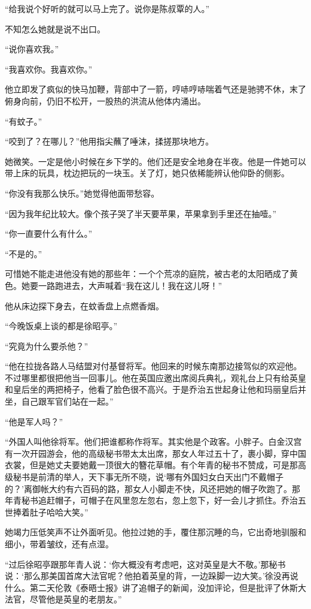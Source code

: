 \par “给我说个好听的就可以马上完了。说你是陈叔覃的人。”
\par 不知怎么她就是说不出口。
\par “说你喜欢我。”
\par “我喜欢你。我喜欢你。”
\par 他立即发了疯似的快马加鞭，背部中了一箭，哼哧哼哧喘着气还是驰骋不休，末了俯身向前，仍旧不松开，一股热的洪流从他体内涌出。
\par “有蚊子。”
\par “咬到了？在哪儿？”他用指尖蘸了唾沫，揉搓那块地方。
\par 她微笑。一定是他小时候在乡下学的。他们还是安全地身在半夜。他是一件她可以带上床的玩具，枕边把玩的一块玉。关了灯，她只依稀能辨认他仰卧的侧影。
\par “你没有我那么快乐。”她觉得他面带愁容。
\par “因为我年纪比较大。像个孩子哭了半天要苹果，苹果拿到手里还在抽噎。”
\par “你一直要什么有什么。”
\par “不是的。”
\par 可惜她不能走进他没有她的那些年：一个个荒凉的庭院，被古老的太阳晒成了黄色。她要一路跑进去，大声喊着“我在这儿！我在这儿呀！”
\par 他从床边探下身去，在蚊香盘上点燃香烟。
\par “今晚饭桌上谈的都是徐昭亭。”
\par “究竟为什么要杀他？”
\par “他在拉拢各路人马结盟对付基督将军。他回来的时候东南那边接驾似的欢迎他。不过哪里都很把他当一回事儿。他在英国应邀出席阅兵典礼，观礼台上只有给英皇和皇后坐的两把椅子，他看了脸色很不高兴。于是乔治五世起身让他和玛丽皇后并坐，自己跟军官们站在一起。”
\par “他是军人吗？”
\par “外国人叫他徐将军。他们把谁都称作将军。其实他是个政客。小胖子。白金汉宫有一次开园游会，他的高级秘书带太太出席，那女人年过五十了，裹小脚，穿中国衣裳，但是她丈夫要她戴一顶很大的簪花草帽。有个年青的秘书不赞成，可是那高级秘书是前清的举人，天下事无所不晓，说‘哪有外国妇女白天出门不戴帽子的？’离御帐大约有六百码的路，那女人小脚走不快，风还把她的帽子吹跑了。那年青秘书追赶帽子，可帽子在风里忽左忽右，忽上忽下，好一会儿才抓住。乔治五世捧着肚子哈哈大笑。”
\par 她竭力压低笑声不让外面听见。他拉过她的手，覆住那沉睡的鸟，它出奇地驯服和细小，带着皱纹，还有点湿。
\par “过后徐昭亭跟那年青人说：‘你大概没有考虑吧，这对英皇是大不敬。’那秘书说：‘那么那美国首席大法官呢？他拍着英皇的背，一边跺脚一边大笑。’徐没再说什么。第二天伦敦《泰晤士报》讲了追帽子的新闻，没加评论，但是批评了休斯大法官，尽管他是英皇的老朋友。”
